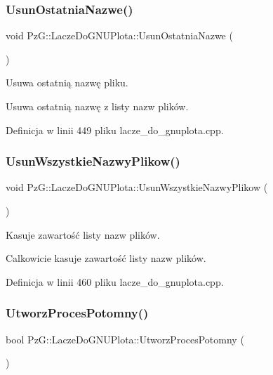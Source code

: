 \subsubsection{\texorpdfstring{Usun\+Ostatnia\+Nazwe()}{UsunOstatniaNazwe()}}
{\footnotesize\ttfamily void Pz\+G\+::\+Lacze\+Do\+G\+N\+U\+Plota\+::\+Usun\+Ostatnia\+Nazwe (\begin{DoxyParamCaption}{ }\end{DoxyParamCaption})}



Usuwa ostatnią nazwę pliku. 

Usuwa ostatnią nazwę z listy nazw plików. 

Definicja w linii 449 pliku lacze\+\_\+do\+\_\+gnuplota.\+cpp.

\mbox{\label{class_pz_g_1_1_lacze_do_g_n_u_plota_a89a1d90d017d264cd26398464d074073}} 
\subsubsection{\texorpdfstring{Usun\+Wszystkie\+Nazwy\+Plikow()}{UsunWszystkieNazwyPlikow()}}
{\footnotesize\ttfamily void Pz\+G\+::\+Lacze\+Do\+G\+N\+U\+Plota\+::\+Usun\+Wszystkie\+Nazwy\+Plikow (\begin{DoxyParamCaption}{ }\end{DoxyParamCaption})}



Kasuje zawartość listy nazw plików. 

Calkowicie kasuje zawartość listy nazw plików. 

Definicja w linii 460 pliku lacze\+\_\+do\+\_\+gnuplota.\+cpp.

\mbox{\label{class_pz_g_1_1_lacze_do_g_n_u_plota_a1c7b9acc40de8d8bbb40fb0722512933}} 
\subsubsection{\texorpdfstring{Utworz\+Proces\+Potomny()}{UtworzProcesPotomny()}}
{\footnotesize\ttfamily bool Pz\+G\+::\+Lacze\+Do\+G\+N\+U\+Plota\+::\+Utworz\+Proces\+Potomny (\begin{DoxyParamCaption}{ }\end{DoxyParamCaption})\hspace{0.3cm}{\ttfamily [protected]}}



